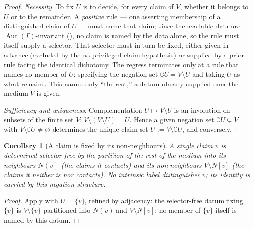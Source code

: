 \documentclass[11pt,twocolumn,a4paper]{article}
\theoremstyle{thmstyle}
\newtheorem{corollary}[theorem]{Corollary}
\theoremstyle{definition}
\theoremstyle{remark}
\newcommand{\Gph}{\Gamma}
\newcommand{\V}{V}
\newcommand{\co}{\complement}
\begin{document}
\begin{proof}
\emph{Necessity.} To fix $U$ is to decide, for every claim of $\V$, whether
it belongs to $U$ or to the remainder. A \emph{positive} rule --- one
asserting membership of a distinguished claim of $U$ --- must name that
claim; since the available data are $\operatorname{Aut}(\Gph)$-invariant
(), no claim is named by the data alone, so the rule
must itself supply a selector. That selector must in turn be fixed, either
given in advance (excluded by the no-privileged-claim hypothesis) or
supplied by a prior rule facing the identical dichotomy. The regress
terminates only at a rule that names no member of $U$: specifying the
negation set $\co U=\V\setminus U$ and taking $U$ as what remains. This
names only ``the rest,'' a datum already supplied once the medium $\V$ is
given.

\emph{Sufficiency and uniqueness.} Complementation $U\mapsto\V\setminus U$
is an involution on subsets of the finite set $\V$: $\V\setminus(\V
\setminus U)=U$. Hence a given negation set $\co U\subsetneq\V$ with
$\V\setminus\co U\neq\varnothing$ determines the unique claim set
$U:=\V\setminus\co U$, and conversely.
\end{proof}

\begin{corollary}[A claim is fixed by its non-neighbours]
\label{cor:claim-negation}
A single claim $v$ is determined selector-free by the partition of the
rest of the medium into its neighbours $N(v)$ (the claims it contacts) and
its non-neighbours $\V\setminus N[v]$ (the claims it neither is nor
contacts). No intrinsic label distinguishes $v$; its identity is carried
by this negation structure.
\end{corollary}

\begin{proof}
Apply  with $U=\{v\}$, refined by adjacency: the
selector-free datum fixing $\{v\}$ is $\V\setminus\{v\}$ partitioned into
$N(v)$ and $\V\setminus N[v]$; no member of $\{v\}$ itself is named by
this datum.
\end{proof}
\end{document}

